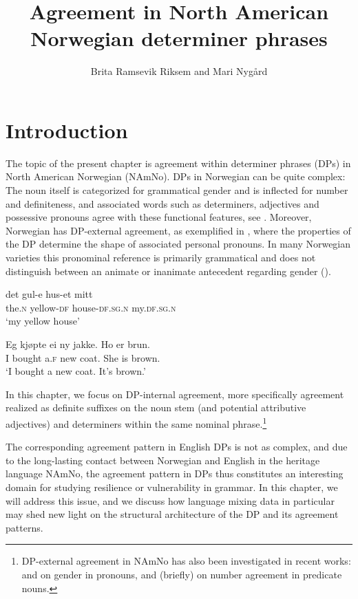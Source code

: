 \documentclass[output=paper]{langscibook}
\author{Brita Ramsevik Riksem\affiliation{Norwegian University of Science and Technology, Trondheim} and Mari Nygård\affiliation{Norwegian University of Science and Technology, Trondheim}}
\title{Agreement in North American Norwegian determiner phrases}
\begin{document}
\maketitle 


\section{Introduction}
The topic of the present chapter is agreement within determiner phrases (DPs) in North American Norwegian (NAmNo). DPs in Norwegian can be quite complex: The noun itself is categorized for grammatical gender and is inflected for number and definiteness, and associated words such as determiners, adjectives and possessive pronouns agree with these functional features, see . Moreover, Norwegian has DP-external agreement, as exemplified in , where the properties of the DP determine the shape of associated personal pronouns. In many Norwegian varieties this pronominal reference is primarily grammatical and does not distinguish between an animate or inanimate antecedent regarding gender (\citealt{FaarlundEtAl1997, JohannessenLarsson2018}). 


\ea \label{ex:riksem:1}
\ea \label{ex:riksem:1a}
\gll det     gul-e           hus-et           mitt\\
	 the.\textsc{n} yellow-\textsc{df} house-\textsc{df.sg.n} my.\textsc{df.sg.n}\\
\glt ‘my yellow house’

\ex \label{ex:riksem:1b}
\gll Eg kjøpte   ei    ny    jakke. Ho er brun.\\
	 I     bought a.\textsc{f} new coat.  She is brown.\\
\glt ‘I bought a new coat. It’s brown.’
\z
\z


In this chapter, we focus on DP-internal agreement, more specifically agreement realized as definite suffixes on the noun stem (and potential attributive adjectives) and determiners within the same nominal phrase.\footnote{DP-external agreement in NAmNo has also been investigated in recent works: \citet{Rødvand2017} and \citet{JohannessenLarsson2018} on gender in pronouns, and \citet{Kinn2020} (briefly) on number agreement in predicate nouns.} 



The corresponding agreement pattern in English DPs is not as complex, and due to the long-lasting contact between Norwegian and English in the heritage language NAmNo, the agreement pattern in DPs thus constitutes an interesting domain for studying resilience or vulnerability in grammar. In this chapter, we will address this issue, and we discuss how language mixing data in particular may shed new light on the structural architecture of the DP and its agreement patterns. 
\end{document}
